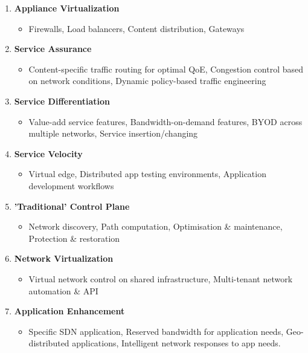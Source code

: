 \begin{enumerate}
\item \textbf{Appliance Virtualization}
	\begin{itemize}
	\item Firewalls, Load balancers, Content distribution, Gateways
	\end{itemize}
\item \textbf{Service Assurance}
	\begin{itemize}
	\item Content-specific traffic routing for optimal QoE, Congestion control based on network conditions, Dynamic policy-based traffic engineering 
	\end{itemize}
\item \textbf{Service Differentiation}
	\begin{itemize}
	\item Value-add service features, Bandwidth-on-demand features, BYOD across multiple networks, Service insertion/changing
	\end{itemize}
\item \textbf{Service Velocity}
	\begin{itemize}
	\item Virtual edge, Distributed app testing environments, Application development workflows 
	\end{itemize}
\item \textbf{'Traditional' Control Plane}
	\begin{itemize}
	\item Network discovery, Path computation, Optimisation \& maintenance, Protection \& restoration
	\end{itemize}
\item \textbf{Network Virtualization}
	\begin{itemize}
	\item Virtual network control on shared infrastructure, Multi-tenant network automation \& API
	\end{itemize}
\item \textbf{Application Enhancement}
	\begin{itemize}
	\item Specific SDN application, Reserved bandwidth for application needs, Geo-distributed applications, Intelligent network responses to app needs.\\
	\end{itemize}
\end{enumerate}

